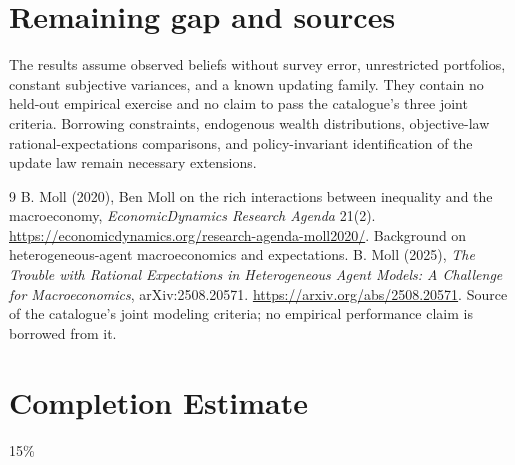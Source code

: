 \documentclass[11pt,a4paper]{article}
\theoremstyle{definition}
\theoremstyle{remark}
\begin{document}
\section{Remaining gap and sources}
The results assume observed beliefs without survey error, unrestricted portfolios, constant subjective variances, and a known updating family. They contain no held-out empirical exercise and no claim to pass the catalogue's three joint criteria. Borrowing constraints, endogenous wealth distributions, objective-law rational-expectations comparisons, and policy-invariant identification of the update law remain necessary extensions.
\begin{thebibliography}{9}
 B. Moll (2020), Ben Moll on the rich interactions between inequality and the macroeconomy, \emph{EconomicDynamics Research Agenda} 21(2). \url{https://economicdynamics.org/research-agenda-moll2020/}. Background on heterogeneous-agent macroeconomics and expectations.
 B. Moll (2025), \emph{The Trouble with Rational Expectations in Heterogeneous Agent Models: A Challenge for Macroeconomics}, arXiv:2508.20571. \url{https://arxiv.org/abs/2508.20571}. Source of the catalogue's joint modeling criteria; no empirical performance claim is borrowed from it.
\end{thebibliography}

\section{Completion Estimate}
15\%
\end{document}
